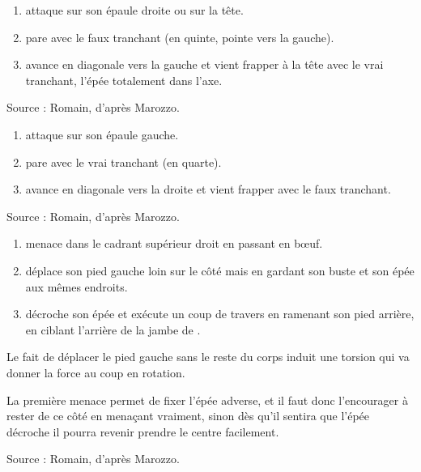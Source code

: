 \begin{technique}

\begin{enumerate}
	\item \A attaque \D sur son épaule droite ou sur la tête.
	
	\item \D pare avec le faux tranchant (en quinte, pointe vers la gauche).
	
	\item \D avance en diagonale vers la gauche et vient frapper \A à la tête avec le vrai tranchant, l'épée totalement dans l'axe.
\end{enumerate}

Source : Romain, d'après Marozzo.

\end{technique}


\begin{technique}

\begin{enumerate}
	\item \A attaque \D sur son épaule gauche.
	
	\item \D pare avec le vrai tranchant (en quarte).
	
	\item \D avance en diagonale vers la droite et vient frapper \A avec le faux tranchant.
\end{enumerate}

Source : Romain, d'après Marozzo.

\end{technique}


\begin{technique}

\begin{enumerate}
	\item \A menace \D dans le cadrant supérieur droit en passant en bœuf.
	
	\item \A déplace son pied gauche loin sur le côté mais en gardant son buste et son épée aux mêmes endroits.
	
	\item \A décroche son épée et exécute un coup de travers en ramenant son pied arrière, en ciblant l'arrière de la jambe de \D.
\end{enumerate}

Le fait de déplacer le pied gauche sans le reste du corps induit une torsion qui va donner la force au coup en rotation.

La première menace permet de fixer l'épée adverse, et il faut donc l'encourager à rester de ce côté en menaçant vraiment, sinon dès qu'il sentira que l'épée décroche il pourra revenir prendre le centre facilement.

Source : Romain, d'après Marozzo.
\end{technique}


